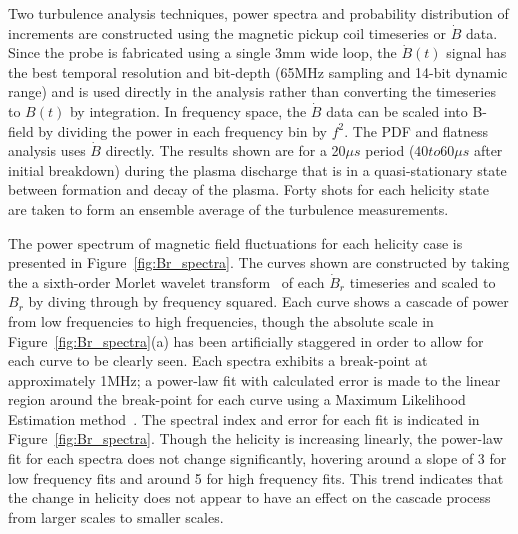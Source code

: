 \documentclass[aip,prl,amsmath,amssymb,reprint,superscriptaddress]{revtex4-1} %
\begin{document}
Two turbulence analysis techniques, power spectra and probability distribution of increments are constructed using the magnetic pickup coil timeseries or $\dot{B}$ data. Since the probe is fabricated using a single 3mm wide loop, the $\dot{B}(t)$ signal has the best temporal resolution and bit-depth (65MHz sampling and 14-bit dynamic range) and is used directly in the analysis rather than converting the timeseries to $B(t)$ by integration. In frequency space, the $\dot{B}$ data can be scaled into B-field by dividing the power in each frequency bin by $f^{2}$. The PDF and flatness analysis uses $\dot{B}$ directly. The results shown are for a 20$\mu s$ period ($40 to 60 \mu s$ after initial breakdown) during the plasma discharge that is in a quasi-stationary state between formation and decay of the plasma. Forty shots for each helicity state are taken to form an ensemble average of the turbulence measurements.

The power spectrum of magnetic field fluctuations for each helicity case is presented in Figure~\ref{fig:Br_spectra}. The curves shown are constructed by taking the a sixth-order Morlet wavelet transform~\cite{torrence98} of each $\dot{B}_{r}$ timeseries and scaled to $B_{r}$ by diving through by frequency squared. Each curve shows a cascade of power from low frequencies to high frequencies, though the absolute scale in Figure~\ref{fig:Br_spectra}(a) has been artificially staggered in order to allow for each curve to be clearly seen. Each spectra exhibits a break-point at approximately 1MHz; a power-law fit with calculated error is made to the linear region around the break-point for each curve using a Maximum Likelihood Estimation method~\cite{clauset09}. The spectral index and error for each fit is indicated in Figure~\ref{fig:Br_spectra}. Though the helicity is increasing linearly, the power-law fit for each spectra does not change significantly, hovering around a slope of 3 for low frequency fits and around 5 for high frequency fits. This trend indicates that the change in helicity does not appear to have an effect on the cascade process from larger scales to smaller scales.
\end{document}
